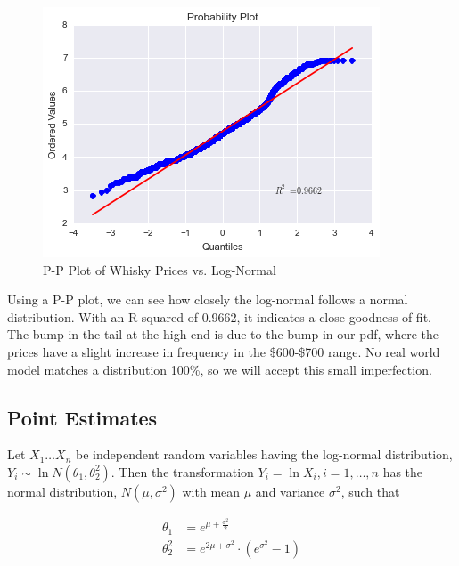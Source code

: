 \begin{figure}[htb]
\centering
\includegraphics[scale=1]{price_pp_plot_log_normal} 
\caption{P-P Plot of Whisky Prices vs. Log-Normal}
\label{fig:price_pp_plot_log_normal} 
\end{figure}

Using a P-P plot, we can see how closely the log-normal follows a normal distribution. With an R-squared of 0.9662, it indicates a close goodness of fit. The bump in the tail at the high end is due to the bump in our pdf, where the prices have a slight increase in frequency in the \$600-\$700 range. No real world model matches a distribution 100\%, so we will accept this small imperfection.

\pagebreak


\subsection{Point Estimates}

Let $X_1 \hdots X_n$ be independent random variables having the log-normal distribution, $Y_i \sim \ln{N(\theta_1, \theta_2^2)}$. Then the transformation $Y_i = \ln{X_i}, i = 1, \hdots, n$ has the normal distribution, $N(\mu, \sigma^2)$ with mean $\mu$ and variance $\sigma^2$, such that

\begin{equation*}
\begin{split}
    \theta_1 &= e^{\mu + \frac{\sigma^2}{2}}\\
    \theta_2^2 &= e^{2 \mu + \sigma^2} \cdot (e^{\sigma^2} - 1)\\
\end{split}
\end{equation*}

